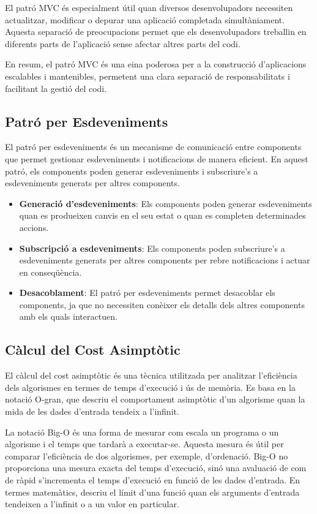 \documentclass{ieeetj}
\begin{document}
El patró MVC és especialment útil quan diversos desenvolupadors necessiten actualitzar, modificar o depurar una aplicació completada simultàniament. Aquesta separació de preocupacions permet que els desenvolupadors treballin en diferents parts de l'aplicació sense afectar altres parts del codi.

En resum, el patró MVC és una eina poderosa per a la construcció d'aplicacions escalables i mantenibles, permetent una clara separació de responsabilitats i facilitant la gestió del codi.

\subsection{Patró per Esdeveniments}
El patró per esdeveniments és un mecanisme de comunicació entre components que permet gestionar esdeveniments i notificacions de manera eficient. En aquest patró, els components poden generar esdeveniments i subscriure's a esdeveniments generats per altres components.

\begin{itemize}
    \item \textbf{Generació d'esdeveniments}: Els components poden generar esdeveniments quan es produeixen canvis en el seu estat o quan es completen determinades accions.
    \item \textbf{Subscripció a esdeveniments}: Els components poden subscriure's a esdeveniments generats per altres components per rebre notificacions i actuar en conseqüència.
    \item \textbf{Desacoblament}: El patró per esdeveniments permet desacoblar els components, ja que no necessiten conèixer els detalls dels altres components amb els quals interactuen.
\end{itemize}

\subsection{Càlcul del Cost Asimptòtic}
El càlcul del cost asimptòtic és una tècnica utilitzada per analitzar l'eficiència dels algorismes en termes de temps d'execució i ús de memòria. Es basa en la notació O-gran, que descriu el comportament asimptòtic d'un algorisme quan la mida de les dades d'entrada tendeix a l'infinit.

La notació Big-O és una forma de mesurar com escala un programa o un algorisme i el temps que tardarà a executar-se. Aquesta mesura és útil per comparar l'eficiència de dos algorismes, per exemple, d'ordenació. Big-O no proporciona una mesura exacta del temps d'execució, sinó una avaluació de com de ràpid s'incrementa el temps d'execució en funció de les dades d'entrada. En termes matemàtics, descriu el límit d'una funció quan els arguments d'entrada tendeixen a l'infinit o a un valor en particular.
\end{document}
